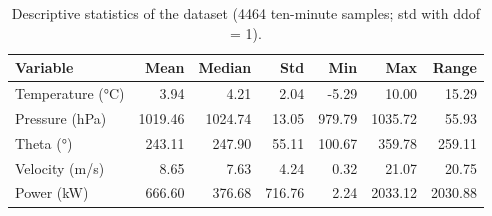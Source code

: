\begin{table}[htbp]
\centering
\small
\caption{Descriptive statistics of the dataset (4464 ten-minute samples; std with ddof = 1).}
\label{tab:t1}
\begin{tabular}{lrrrrrr}
\toprule
Variable & Mean & Median & Std & Min & Max & Range \\
\midrule
Temperature (°C) & 3.94 & 4.21 & 2.04 & -5.29 & 10.00 & 15.29 \\
Pressure (hPa) & 1019.46 & 1024.74 & 13.05 & 979.79 & 1035.72 & 55.93 \\
Theta (°) & 243.11 & 247.90 & 55.11 & 100.67 & 359.78 & 259.11 \\
Velocity (m/s) & 8.65 & 7.63 & 4.24 & 0.32 & 21.07 & 20.75 \\
Power (kW) & 666.60 & 376.68 & 716.76 & 2.24 & 2033.12 & 2030.88 \\
\bottomrule
\end{tabular}
\end{table}
